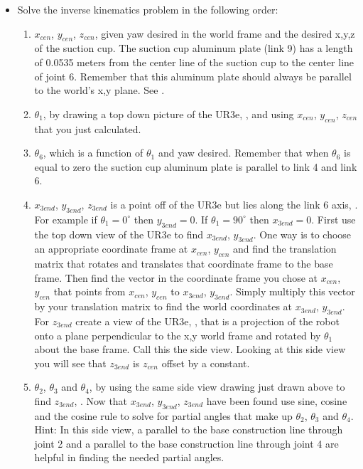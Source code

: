 \begin{itemize}
\item Solve the inverse kinematics problem in the following order:
\begin{enumerate}
	\item $x_{cen}$, $y_{cen}$, $z_{cen}$, given yaw desired in the world frame and the desired x,y,z of the suction cup. The suction cup aluminum
plate (link 9) has a length of 0.0535 meters from the center line of the suction cup to the center line of joint 6. Remember that this
aluminum plate should always be parallel to the world's x,y plane.  See .	
	\item $\theta_1$, by drawing a top down picture of the UR3e, , and using $x_{cen}$, $y_{cen}$, $z_{cen}$ that you just calculated.
	\item $\theta_6$, which is a function of $\theta_1$ and yaw desired.  Remember that when $\theta_6$ is equal to zero the suction cup aluminum plate
is parallel to link 4 and link 6.
  	\item $x_{3end}$, $y_{3end}$, $z_{3end}$ is a point off of the UR3e but lies along the link 6 axis, .  For example if $\theta_1 = 0^{\circ}$ then $y_{3end} = 0$.
If $\theta_1 = 90^{\circ}$ then $x_{3end} = 0$.  First use the top down view of the UR3e to find $x_{3end}$, $y_{3end}$.  One way is to choose an appropriate
coordinate frame at $x_{cen}$, $y_{cen}$ and find the translation matrix that rotates and translates that coordinate frame to the base frame.  
Then find the vector in the coordinate frame you chose at $x_{cen}$, $y_{cen}$ that points from $x_{cen}$, $y_{cen}$ to $x_{3end}$, $y_{3end}$.
Simply multiply this vector by your translation matrix to find the world coordinates at $x_{3end}$, $y_{3end}$.  For $z_{3end}$ create a view of
the UR3e, , that is a projection of the robot onto a plane perpendicular to the x,y world frame and rotated by $\theta_1$ about
the base frame.  Call this the side view.  Looking at this side view you will see that $z_{3end}$ is $z_{cen}$ offset by a constant.    
	\item $\theta_2$, $\theta_3$ and $\theta_4$, by using the same side view drawing just drawn above to find $z_{3end}$, .
Now that $x_{3end}$, $y_{3end}$, $z_{3end}$ have
been found use sine, cosine and the cosine rule to solve for partial angles that make up $\theta_2$, $\theta_3$ and $\theta_4$.  Hint:  In this side view, a parallel to the base construction line through joint 2
and a parallel to the base construction line through joint 4 are helpful in finding the needed partial angles.       		
\end{enumerate}
\end{itemize}

